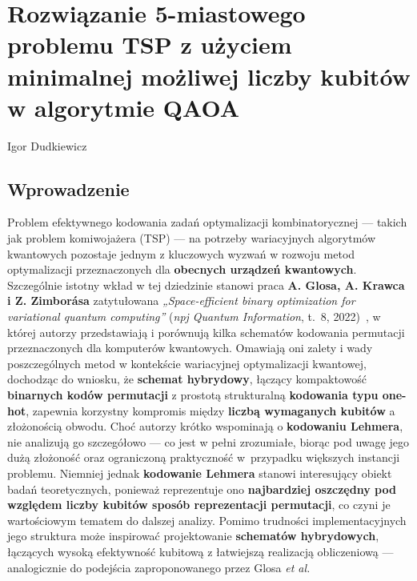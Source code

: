 \chapter[Rozwiązanie 5-miastowego \ldots]{Rozwiązanie 5-miastowego problemu TSP z użyciem minimalnej możliwej liczby kubitów w algorytmie QAOA}
\thispagestyle{empty}
\vspace{-8mm} {\large Igor Dudkiewicz} \vspace{8mm}

\section{Wprowadzenie}
Problem efektywnego kodowania zadań optymalizacji kombinatorycznej — takich jak problem komiwojażera (TSP) — na potrzeby wariacyjnych algorytmów kwantowych pozostaje jednym z kluczowych wyzwań w rozwoju metod optymalizacji przeznaczonych dla \textbf{obecnych urządzeń kwantowych}. Szczególnie istotny wkład w tej dziedzinie stanowi praca \textbf{A. Glosa, A. Krawca i Z. Zimborása} zatytułowana \textit{„Space-efficient binary optimization for variational quantum computing”} (\textit{npj Quantum Information}, t.~8, 2022)~\cite{glos2022space}, w której autorzy przedstawiają i porównują kilka schematów kodowania permutacji przeznaczonych dla komputerów kwantowych. Omawiają oni zalety i wady poszczególnych metod w kontekście wariacyjnej optymalizacji kwantowej, dochodząc do wniosku, że \textbf{schemat hybrydowy}, łączący kompaktowość \textbf{binarnych kodów permutacji} z prostotą strukturalną \textbf{kodowania typu one-hot}, zapewnia korzystny kompromis między \textbf{liczbą wymaganych kubitów} a złożonością obwodu.
Choć autorzy krótko wspominają o \textbf{kodowaniu Lehmera}, nie analizują go szczegółowo — co jest w pełni zrozumiałe, biorąc pod uwagę jego dużą złożoność oraz ograniczoną praktyczność w~przypadku większych instancji problemu. Niemniej jednak \textbf{kodowanie Lehmera} stanowi interesujący obiekt badań teoretycznych, ponieważ reprezentuje ono \textbf{najbardziej oszczędny pod względem liczby kubitów sposób reprezentacji permutacji}, co czyni je wartościowym tematem do dalszej analizy. Pomimo trudności implementacyjnych jego struktura może inspirować projektowanie \textbf{schematów hybrydowych}, łączących wysoką efektywność kubitową z łatwiejszą realizacją obliczeniową — analogicznie do podejścia zaproponowanego przez Glosa \textit{et al.}
